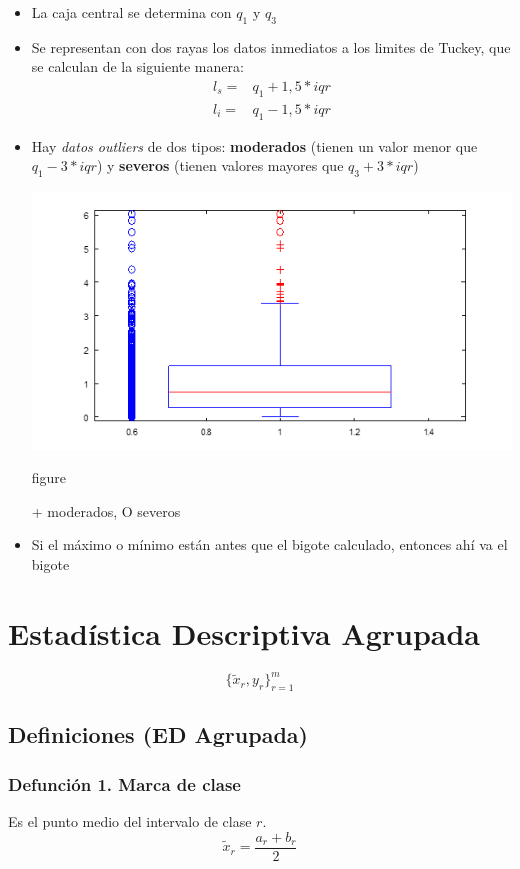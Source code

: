 \documentclass{article}
\begin{document}
\begin{itemize}
    \item La caja central se determina con $q_1$ y $q_3$
    \item Se representan con dos rayas los datos inmediatos a los limites de Tuckey,
    que se calculan de la siguiente manera:
    \begin{align*}
        l_s =& q_1 + 1,5 * iqr \\
        l_i =& q_1 - 1,5 * iqr
    \end{align*}
    \item Hay \emph{datos outliers} de dos tipos: \textbf{moderados} (tienen un valor menor que $q_1 - 3 * iqr$)
    y \textbf{severos} (tienen valores mayores que $q_3 + 3 * iqr$)
    \begin{center}
        \includegraphics[width=.50\textwidth]{Images/BoxplotModeradosSeveros.png}
        \caption{figure}{+ moderados, O severos}
    \end{center}
    \item Si el máximo o mínimo están antes que el bigote calculado, entonces ahí va el bigote
\end{itemize}

\section*{Estadística Descriptiva Agrupada}
\begin{equation*}
    \{\tilde{x}_r, y_r\}^m_{r=1}
\end{equation*}
\subsection{Definiciones (ED Agrupada)}
\subsubsection*{Defunción 1. Marca de clase}
Es el punto medio del intervalo de clase $r$.
\begin{equation*}
    \tilde{x}_r = \frac{a_r + b_r}{2}
\end{equation*}
\end{document}
